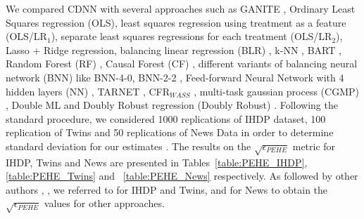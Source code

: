 \documentclass[sigconf]{acmart}
\newcommand{\eat}[1]{}
\theoremstyle{plain}
\numberwithin{equation}{section}
\begin{document}
We compared CDNN with several approaches such as GANITE \cite{GANITE}, Ordinary Least Squares regression (OLS), least squares regression using treatment as a feature (OLS/LR$_1$), separate least squares regressions for each treatment (OLS/LR$_2$), Lasso + Ridge regression\cite{learningRepresentations}, balancing linear regression (BLR) \cite{blrJohansson}, k-NN \cite{knnCrump}, BART \cite{bartChipman}, Random Forest (RF) \cite{randomForest}, Causal Forest (CF) \cite{causalForest}, different variants of balancing neural network (BNN) like BNN-4-0, BNN-2-2 \cite{blrJohansson}, Feed-forward Neural Network with 4 hidden layers (NN) \cite{blrJohansson}, TARNET \cite{dnnShalit}, CFR$_{W ASS}$ \cite{dnnShalit}, multi-task gaussian process (CGMP) \cite{cmgp}, Double ML \cite{doubleML} and Doubly Robust regression (Doubly Robust) \cite{doublyRobust}.
Following the standard procedure, we considered 1000 replications of IHDP dataset, 100 replication of Twins and 50 replications of News Data in order to determine \eat{confidence intervals}standard deviation for our estimates \cite{GANITE}. The results on the $\sqrt{\epsilon_{PEHE}}$ metric for IHDP, Twins and News are presented in Tables~\ref{table:PEHE_IHDP}, \ref{table:PEHE_Twins} and ~\ref{table:PEHE_News} respectively. As followed by other authors \cite{dnnShalit}, \cite{GANITE}, we referred to \cite{GANITE} for IHDP and Twins, and \cite{learningRepresentations} for News to obtain the $\sqrt{\epsilon_{PEHE}}$ values for other approaches.
\end{document}
